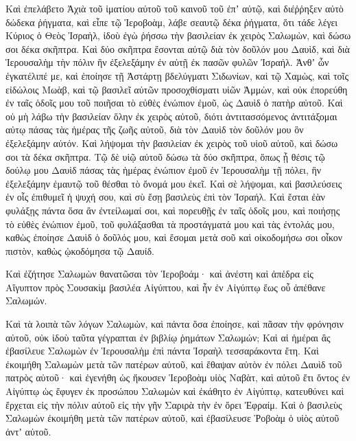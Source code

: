 {Καὶ ἐπελάβετο Ἀχιὰ τοῦ ἱματίου αὐτοῦ τοῦ καινοῦ τοῦ ἐπʼ αὐτῷ, καὶ διέῤῥηξεν αὐτὸ δώδεκα ῥήγματα,
καὶ εἶπε τῷ Ἱεροβοὰμ, λάβε σεαυτῷ δέκα ῥήγματα, ὅτι τάδε λέγει Κύριος ὁ Θεὸς Ἰσραὴλ, ἰδοὺ ἐγὼ ῥήσσω τὴν βασιλείαν ἐκ χειρὸς Σαλωμὼν, καὶ δώσω σοι δέκα σκῆπτρα.
Καὶ δύο σκῆπτρα ἔσονται αὐτῷ διὰ τὸν δοῦλόν μου Δαυὶδ, καὶ διὰ Ἱερουσαλὴμ τὴν πόλιν ἣν ἐξελεξάμην ἐν αὐτῇ ἐκ πασῶν φυλῶν Ἰσραήλ.
Ἀνθʼ ὧν ἐγκατέλιπέ με, καὶ ἐποίησε τῇ Ἀστάρτῃ βδελύγματι Σιδωνίων, καὶ τῷ Χαμὼς, καὶ τοῖς εἰδώλοις Μωὰβ, καὶ τῷ βασιλεῖ αὐτῶν προσοχθίσματι υἱῶν Ἀμμὼν, καὶ οὐκ ἐπορεύθη ἐν ταῖς ὁδοῖς μου τοῦ ποιῆσαι τὸ εὐθὲς ἐνώπιον ἐμοῦ, ὡς Δαυὶδ ὁ πατὴρ αὐτοῦ.
Καὶ οὐ μὴ λάβω τὴν βασιλείαν ὅλην ἐκ χειρὸς αὐτοῦ, διότι ἀντιτασσόμενος ἀντιτάξομαι αὐτῳ πάσας τὰς ἡμέρας τῆς ζωῆς αὐτοῦ, διὰ τὸν Δαυὶδ τὸν δοῦλόν μου ὃν ἐξελεξάμην αὐτόν.
Καὶ λήψομαι τὴν βασιλείαν ἐκ χειρὸς τοῦ υἱοῦ αὐτοῦ, καὶ δώσω σοι τὰ δέκα σκῆπτρα.
Τῷ δὲ υἱῷ αὐτοῦ δώσω τὰ δύο σκῆπτρα, ὅπως ᾖ θέσις τῷ δούλῳ μου Δαυὶδ πάσας τὰς ἡμέρας ἐνώπιον ἐμοῦ ἐν Ἱερουσαλὴμ τῇ πόλει, ἣν ἐξελεξάμην ἐμαυτῷ τοῦ θέσθαι τὸ ὄνομά μου ἐκεῖ.
Καὶ σὲ λήψομαι, καὶ βασιλεύσεις ἐν οἷς ἐπιθυμεῖ ἡ ψυχή σου, καὶ σὺ ἔσῃ βασιλεὺς ἐπὶ τὸν Ἰσραήλ.
Καὶ ἔσται ἐὰν φυλάξῃς πάντα ὅσα ἂν ἐντείλωμαί σοι, καὶ πορευθῇς ἐν ταῖς ὁδοῖς μου, καὶ ποιήσῃς τὸ εὐθὲς ἐνώπιον ἐμοῦ, τοῦ φυλάξασθαι τὰ προστάγματά μου καὶ τὰς ἐντολάς μου, καθὼς ἐποίησε Δαυὶδ ὁ δοῦλός μου, καὶ ἔσομαι μετὰ σοῦ καὶ οἰκοδομήσω σοι οἶκον πιστὸν, καθὼς ᾠκοδόμησα τῷ Δαυίδ.
\par }{\PP {}Καὶ ἐζήτησε Σαλωμὼν θανατῶσαι τὸν Ἱεροβοάμ· καὶ ἀνέστη καὶ ἀπέδρα εἰς Αἴγυπτον πρὸς Σουσακὶμ βασιλέα Αἰγύπτου, καὶ ἦν ἐν Αἰγύπτῳ ἕως οὗ ἀπέθανε Σαλωμών.
\par }{\PP {}Καὶ τὰ λοιπὰ τῶν λόγων Σαλωμὼν, καὶ πάντα ὅσα ἐποίησε, καὶ πᾶσαν τὴν φρόνησιν αὐτοῦ, οὐκ ἰδοὺ ταῦτα γέγραπται ἐν βιβλίῳ ῥημάτων Σαλωμών;
Καὶ αἱ ἡμέραι ἃς ἐβασίλευε Σαλωμὼν ἐν Ἱερουσαλὴμ ἐπὶ πάντα Ἰσραὴλ τεσσαράκοντα ἔτη.
Καὶ ἐκοιμήθη Σαλωμὼν μετὰ τῶν πατέρων αὐτοῦ, καὶ ἔθαψαν αὐτὸν ἐν πόλει Δαυὶδ τοῦ πατρὸς αὐτοῦ· καὶ ἐγενήθη ὡς ἤκουσεν Ἱεροβοὰμ υἱὸς Ναβὰτ, καὶ αὐτοῦ ἔτι ὄντος ἐν Αἰγύπτῳ ὡς ἔφυγεν ἐκ προσώπου Σαλωμὼν καὶ ἐκάθητο ἐν Αἰγύπτῳ, κατευθύνει καὶ ἔρχεται εἰς τὴν πόλιν αὐτοῦ εἰς τὴν γῆν Σαριρὰ τὴν ἐν ὄρει Ἐφραίμ. Καὶ ὁ βασιλεὺς Σαλωμὼν ἐκοιμήθη μετὰ τῶν πατέρων αὐτοῦ, καὶ ἐβασίλευσε Ῥοβοὰμ ὁ υἱὸς αὐτοῦ ἀντʼ αὐτοῦ.

}
